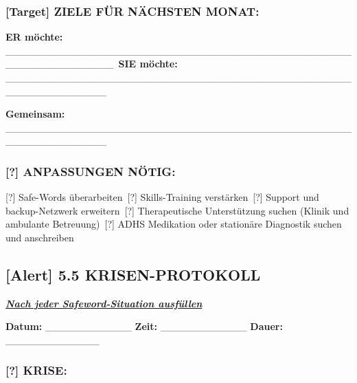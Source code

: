 \hypertarget{section-11}{%
\subsubsection{}\label{section-11}}

\hypertarget{ziele-fuxfcr-nuxe4chsten-monat}{%
\subsubsection{\texorpdfstring{\textbf{[Target] ZIELE FÜR NÄCHSTEN MONAT:}}{[Target] ZIELE FÜR NÄCHSTEN MONAT:}}\label{ziele-fuxfcr-nuxe4chsten-monat}}

\textbf{ER möchte:} \_\_\_\_\_\_\_\_\_\_\_\_\_\_\_\_\_\_\_\_\_\_\_\_\_\_\_\_\_\_\_\_\_\_\_\_\_\_\_\_\_\_\_\_\_\_\_\_\_\_\_\_\_\_\_\_\_\_\_\_\_\_\_\
\textbf{SIE möchte:} \_\_\_\_\_\_\_\_\_\_\_\_\_\_\_\_\_\_\_\_\_\_\_\_\_\_\_\_\_\_\_\_\_\_\_\_\_\_\_\_\_\_\_\_\_\_\_\_\_\_\_\_\_\_\_\_\_\_\_\_\_\_

\textbf{Gemeinsam:} \_\_\_\_\_\_\_\_\_\_\_\_\_\_\_\_\_\_\_\_\_\_\_\_\_\_\_\_\_\_\_\_\_\_\_\_\_\_\_\_\_\_\_\_\_\_\_\_\_\_\_\_\_\_\_\_\_\_\_\_\_\_

\hypertarget{anpassungen-nuxf6tig}{%
\subsubsection{\texorpdfstring{\textbf{[?] ANPASSUNGEN NÖTIG:}}{[?] ANPASSUNGEN NÖTIG:}}\label{anpassungen-nuxf6tig}}

[?] Safe-Words überarbeiten\
[?] Skills-Training verstärken\
[?] Support und backup-Netzwerk erweitern\
[?] Therapeutische Unterstützung suchen (Klinik und ambulante Betreuung)\
[?] ADHS Medikation oder stationäre Diagnostik suchen und anschreiben

\hypertarget{krisen-protokoll}{%
\subsection{\texorpdfstring{[Alert] \textbf{5.5 KRISEN-PROTOKOLL}}{[Alert] 5.5 KRISEN-PROTOKOLL}}\label{krisen-protokoll}}

\emph{\textbf{\ul{Nach jeder Safeword-Situation ausfüllen}}}

\textbf{Datum:} \_\_\_\_\_\_\_\_\_\_\_\_ \textbf{Zeit:} \_\_\_\_\_\_\_\_\_\_\_\_ \textbf{Dauer:} \_\_\_\_\_\_\_\_\_\_\_\_\_

\hypertarget{krise}{%
\subsubsection{\texorpdfstring{\textbf{[?] KRISE:}}{[?] KRISE:}}\label{krise}}

